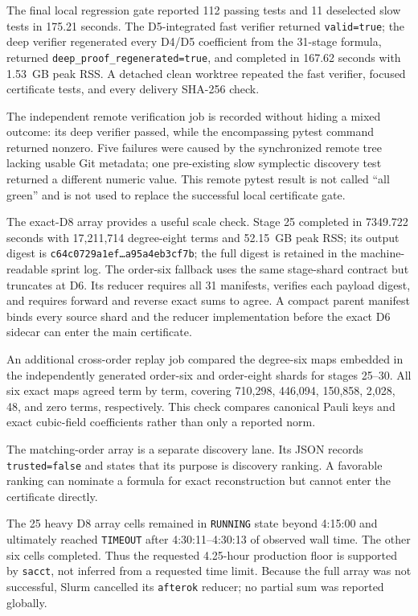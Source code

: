 \documentclass[10pt]{article}
\begin{document}
The final local regression gate reported 112 passing tests and 11 deselected
slow tests in 175.21 seconds.  The D5-integrated fast verifier returned
\texttt{valid=true}; the deep verifier regenerated every D4/D5 coefficient
from the 31-stage formula, returned
\texttt{deep\_proof\_regenerated=true}, and completed in 167.62 seconds with
1.53~GB peak RSS.  A detached clean worktree repeated the fast verifier,
focused certificate tests, and every delivery SHA-256 check.

The independent remote verification job is recorded without hiding a mixed
outcome: its deep verifier passed, while the encompassing pytest command
returned nonzero.  Five failures were caused by the synchronized remote tree
lacking usable Git metadata; one pre-existing slow symplectic discovery test
returned a different numeric value.  This remote pytest result is not called
``all green'' and is not used to replace the successful local certificate
gate.

The exact-D8 array provides a useful scale check.  Stage 25 completed in
7349.722 seconds with 17,211,714 degree-eight terms and 52.15~GB peak RSS;
its output digest is
\texttt{c64c0729a1ef\ldots a95a4eb3cf7b}; the full digest is retained in the
machine-readable sprint log.
The order-six fallback uses the same stage-shard contract but truncates at D6.
Its reducer requires all 31 manifests, verifies each payload digest, and
requires forward and reverse exact sums to agree.  A compact parent manifest
binds every source shard and the reducer implementation before the exact D6
sidecar can enter the main certificate.

An additional cross-order replay job compared the degree-six maps embedded in
the independently generated order-six and order-eight shards for stages
25--30.  All six exact maps agreed term by term, covering 710,298, 446,094,
150,858, 2,028, 48, and zero terms, respectively.  This check compares
canonical Pauli keys and exact cubic-field coefficients rather than only a
reported norm.

The matching-order array is a separate discovery lane.  Its JSON records
\texttt{trusted=false} and states that its purpose is discovery ranking.  A
favorable ranking can nominate a formula for exact reconstruction but cannot
enter the certificate directly.

The 25 heavy D8 array cells remained in \texttt{RUNNING} state beyond
4:15:00 and ultimately reached \texttt{TIMEOUT} after 4:30:11--4:30:13 of
observed wall time.  The other six cells completed.  Thus the requested
4.25-hour production floor is supported by \texttt{sacct}, not inferred from
a requested time limit.  Because the full array was not successful, Slurm
cancelled its \texttt{afterok} reducer; no partial sum was reported globally.
\end{document}

